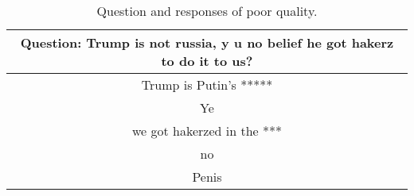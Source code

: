 \begin{table}[H]
\centering
\begin{tabular}{ c }
Question: Trump is not russia, y u no belief he got hakerz to do it to us?\\
\hline\hline
Trump is Putin's *****\\
\hline
Ye\\
\hline
we got hakerzed in the ***\\
\hline
no\\
\hline
Penis\\
\hline
\end{tabular}
\caption{Question and responses of poor quality.}
\label{tab:badq}
\end{table}
